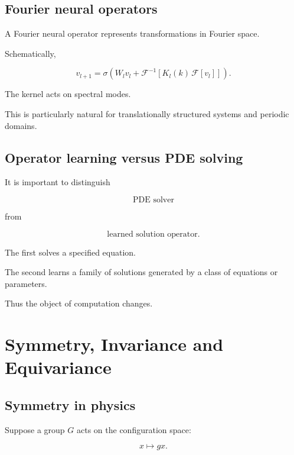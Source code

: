 \documentclass[11pt,a4paper,oneside]{book}
\begin{document}
\section{Fourier neural operators}

A Fourier neural operator represents transformations in Fourier space.

Schematically,

\begin{equation}
v_{l+1}
=
\sigma
\left(
W_l v_l
+
\mathcal{F}^{-1}
\left[
K_l(k)\,
\mathcal{F}[v_l]
\right]
\right).
\end{equation}

The kernel acts on spectral modes.

This is particularly natural for translationally structured systems and
periodic domains.

\section{Operator learning versus PDE solving}

It is important to distinguish

\begin{equation}
\text{PDE solver}
\end{equation}

from

\begin{equation}
\text{learned solution operator}.
\end{equation}

The first solves a specified equation.

The second learns a family of solutions generated by a class of equations or
parameters.

Thus the object of computation changes.

\chapter{Symmetry, Invariance and Equivariance}

\section{Symmetry in physics}

Suppose a group $G$ acts on the configuration space:

\begin{equation}
x\mapsto g x.
\end{equation}
\end{document}

